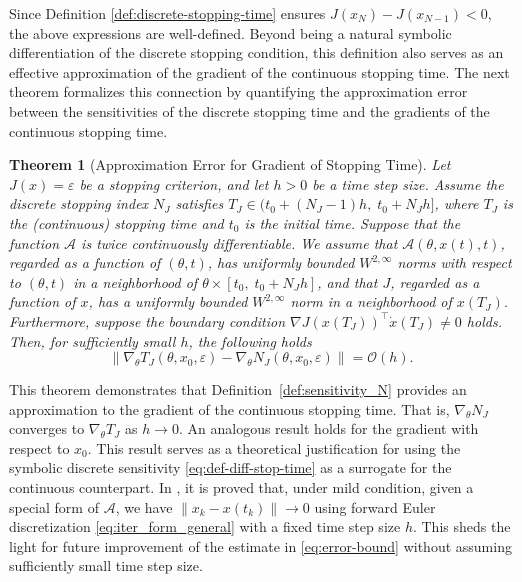 \documentclass{article}
\newcommand{\Acal}{\mathcal{A}}
\newtheorem{theorem}{Theorem}
\begin{document}
Since Definition \ref{def:discrete-stopping-time} ensures $J(x_N) - J(x_{N-1})<0$, the above expressions are well-defined. Beyond being a natural symbolic differentiation of the discrete stopping condition, this definition also serves as an effective approximation of the gradient of the continuous stopping time. The next theorem formalizes this connection by quantifying the approximation error between the sensitivities of the discrete stopping time and the gradients of the continuous stopping time.

\begin{theorem}[Approximation Error for Gradient of Stopping Time]
\label{thm:approx-error}
Let $J(x) = \varepsilon$ be a stopping criterion, and let $h > 0$ be a time step size. Assume the discrete stopping index $N_J$ satisfies $T_J \in (t_0 + (N_J - 1)h, \; t_0 + N_J h]$, where $T_J$ is the (continuous) stopping time and $t_0$ is the initial time. Suppose that the function $\mathcal{A}$ is twice continuously differentiable. We assume that $\mathcal{A}(\theta,x(t),t)$, regarded as a function of $(\theta, t)$, has uniformly bounded $W^{2,\infty}$ norms with respect to $(\theta, t)$ in a neighborhood of $\theta \times [t_0,\; t_0 + N_J h]$, and that $J$, regarded as a function of $x$, has a uniformly bounded $W^{2,\infty}$ norm in a neighborhood of $x(T_J)$. Furthermore, suppose the boundary condition $\nabla J(x(T_J))^\top\dot{x}(T_J)\neq 0$ holds. Then, for sufficiently small $h$, the following holds
\begin{equation}
\label{eq:error-bound}
\left\| \nabla_{\theta} T_J(\theta, x_0, \varepsilon) - \nabla_{\theta} N_J(\theta, x_0, \varepsilon) \right\| = \mathcal{O}(h).
\end{equation}
\end{theorem}
This theorem demonstrates that Definition~\ref{def:sensitivity_N} provides an approximation to the gradient of the continuous stopping time. That is, $\nabla_{\theta} N_J$ converges to $\nabla_{\theta} T_J$ as $h \to 0$. An analogous result holds for the gradient with respect to $x_0$. This result serves as a theoretical justification for using the symbolic discrete sensitivity \eqref{eq:def-diff-stop-time} as a surrogate for the continuous counterpart. In \cite{xie2024ode}, it is proved that, under mild condition, given a special form of $\Acal$, we have $\|x_{k}-x(t_k)\|\to 0$ using forward Euler discretization \eqref{eq:iter_form_general} with a fixed time step size $h$. This sheds the light for future improvement of the estimate in \eqref{eq:error-bound} without assuming sufficiently small time step size.
\end{document}
